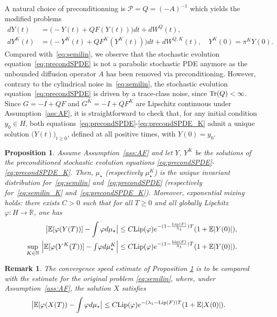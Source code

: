 \documentclass[11pt]{amsart}
\newcommand{\E}{\mathbb{E}}
\newcommand{\R}{\mathbb{R}}
\newcommand{\N}{\mathbb{N}}
\newtheorem{propo}[theo]{Proposition}
\newtheorem{remark}[theo]{Remark}
\begin{document}
A natural choice of preconditionning is $\mathcal{P}=Q=(-A)^{-1}$ which yields the modified problems
\begin{align}
\label{eq:precondSPDE}
dY(t)&=\big(-Y(t)+QF(Y(t))\big)dt+dW^{Q}(t),\\
\label{eq:precondSPDE_K}
dY^K(t)&=\big(-Y^K(t)+QF^K(Y^K(t))\big)dt+dW^{Q,K}(t),\quad
Y^K(0)=\pi^K Y(0).
\end{align}
Compared with~\eqref{eq:semilin}, we observe that the stochastic evolution equation~\eqref{eq:precondSPDE} is not a parabolic stochastic PDE anymore as the unbounded diffusion operator $A$ has been removed via preconditioning. However, contrary to the cylindrical noise in~\eqref{eq:semilin}, the stochastic evolution equation~\eqref{eq:precondSPDE} is driven by a trace-class noise, since ${\rm Tr}(Q)<\infty$. Since $G=-I+QF$ and $G^K=-I+QF^K$ are Lipschitz continuous under Assumption~\ref{ass:AF}, it is straightforward to check that, for any initial condition $y_0\in H$, both equations~\eqref{eq:precondSPDE}-\eqref{eq:precondSPDE_K} admit a unique solution $\bigl(Y(t)\bigr)_{t\ge 0}$, defined at all positive times, with $Y(0)=y_0$.



\begin{propo}\label{propo:invariant}
Assume Assumption~\ref{ass:AF} and let $Y$, $Y^K$ be the solutions of the preconditioned stochastic evolution equations \eqref{eq:precondSPDE}-\eqref{eq:precondSPDE_K}.
Then, $\mu_\star$ (respectively $\mu_\star^K$) is the unique invariant distribution for~\eqref{eq:semilin} and~\eqref{eq:precondSPDE} (respectively for~\eqref{eq:semilin_K} and~\eqref{eq:precondSPDE_K}). Moreover, exponential mixing holds: there exists $C>0$ such that for all $T\ge 0$ and all globally Lipchitz $\varphi: H\rightarrow \R$, one has
\begin{align*}
\big|\E[\varphi(Y(T))]-\int\varphi d\mu_\star\big|&\le C{\rm Lip}(\varphi)e^{-(1-\frac{{\rm Lip}(F)}{\lambda_1})T}(1+\E|Y(0)|),\\
\underset{K\in\N}\sup ~
\Big|\E[\varphi(Y^K(T))]-\textstyle{\int}\varphi d\mu_\star^K\Big|
&\le C{\rm Lip}(\varphi)e^{-(1-\frac{{\rm Lip}(F)}{\lambda_1})T}(1+\E|Y(0)|).
\end{align*}
\end{propo}

\begin{remark}
The convergence speed estimate of Proposition \ref{propo:invariant} is to be compared with the estimate for the original problem \eqref{eq:semilin}, where, under Assumption~\ref{ass:AF}, the solution $X$ satisfies 
\begin{align*}
\big|\E[\varphi(X(T))-\int\varphi d\mu_\star\big|&\le C{\rm Lip}(\varphi)e^{-(\lambda_1-{\rm Lip}(F))T}(1+\E|X(0)|).
\end{align*}
\end{remark}
\end{document}
